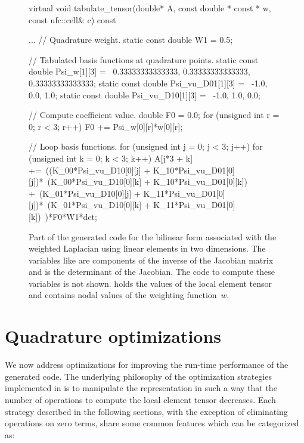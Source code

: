 \begin{figure}
\begin{c++}
virtual void tabulate_tensor(double* A,
                             const double * const * w,
                             const ufc::cell& c) const
{
  ...
  // Quadrature weight.
  static const double W1 = 0.5;

  // Tabulated basis functions at quadrature points.
  static const double Psi_w[1][3] = \
  {{0.33333333333333, 0.33333333333333, 0.33333333333333}};
  static const double Psi_vu_D01[1][3] = \
  {{-1.0, 0.0, 1.0}};
  static const double Psi_vu_D10[1][3] = \
  {{-1.0, 1.0, 0.0}};

  // Compute coefficient value.
  double F0 = 0.0;
  for (unsigned int r = 0; r < 3; r++)
    F0 += Psi_w[0][r]*w[0][r];

  // Loop basis functions.
  for (unsigned int j = 0; j < 3; j++)
  {
    for (unsigned int k = 0; k < 3; k++)
    {
      A[j*3 + k] +=\
      ((K_00*Psi_vu_D10[0][j] + K_10*Psi_vu_D01[0][j])*\
       (K_00*Psi_vu_D10[0][k] + K_10*Psi_vu_D01[0][k]) +\
       (K_01*Psi_vu_D10[0][j] + K_11*Psi_vu_D01[0][j])*\
       (K_01*Psi_vu_D10[0][k] + K_11*Psi_vu_D01[0][k])\
      )*F0*W1*det;
    }
  }
}
\end{c++}
\caption{Part of the generated code for the bilinear form associated
  with the weighted Laplacian using linear elements in two
  dimensions. The variables like \emp{K\_00} are components of the
  inverse of the Jacobian matrix and  is the determinant of the
  Jacobian. The code to compute these variables is not shown. 
  holds the values of the local element tensor and  contains
  nodal values of the weighting function~$w$.}
\label{oelgaard-2:fig:standard_code}
\end{figure}


\section{Quadrature optimizations}
\label{oelgaard-2:sec:quadrature_optimizations}
\index{quadrature optimizations}

We now address optimizations for improving the run-time performance of
the generated code.  The underlying philosophy of the optimization
strategies implemented in \ffc{} is to manipulate the representation
in such a way that the number of operations to compute the local
element tensor decreases.  Each strategy described in the following
sections, with the exception of eliminating operations on zero terms,
share some common features which can be categorized as:

